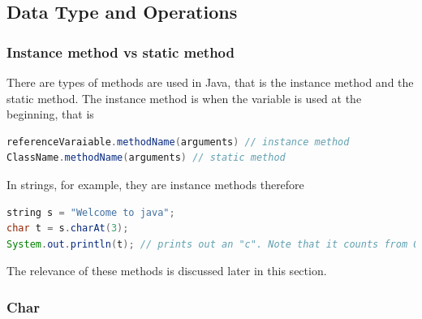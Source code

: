 \documentclass[11pt,a4 paper]{book}
\theoremstyle{plain}
\theoremstyle{definition}
\theoremstyle{remark}
\begin{document}
\begin{flushleft}
\subsection{Data Type and Operations}
\subsubsection{Instance method vs static method}
There are types of methods are used in Java, that is the instance method and the static method. The instance method is when the variable is used at the beginning, that is
\begin{lstlisting}[language = Java]
referenceVaraiable.methodName(arguments) // instance method
ClassName.methodName(arguments) // static method
\end{lstlisting}
In strings, for example, they are instance methods therefore
\begin{lstlisting}[language = Java]
string s = "Welcome to java";
char t = s.charAt(3);
System.out.println(t); // prints out an "c". Note that it counts from 0.
\end{lstlisting}
The relevance of these methods is discussed later in this section.
\subsubsection{Char}


\end{flushleft}
\end{document}
